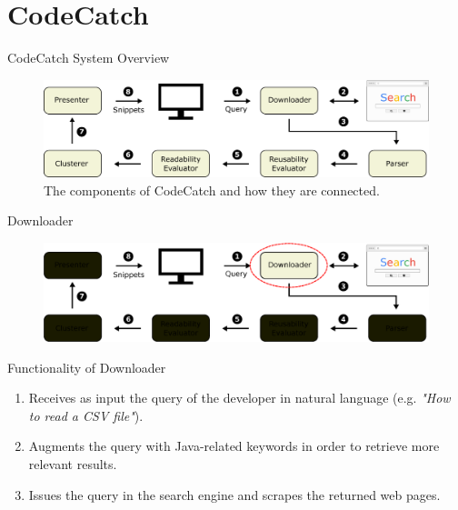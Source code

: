 \documentclass[compress]{beamer}
\begin{document}
\section{CodeCatch}
\begin{frame}{CodeCatch System Overview}

\begin{figure}
	\centering
	\includegraphics[width=\textwidth]{systemoverviewnew}
	\caption{The components of CodeCatch and how they are connected.}
\end{figure}

\end{frame}


\begin{frame}{Downloader}


\begin{figure}[t]
\includegraphics[scale=0.33]{downloader}
\end{figure}

\begin{block}{Functionality of Downloader}
\begin{enumerate}
	\item Receives as input the query of the developer in natural language (e.g. \textit{"How to read a CSV file"}).
	\item Augments the query with Java-related keywords in order to retrieve more relevant results.
	\item Issues the query in the search engine and scrapes the returned web pages.
\end{enumerate}
\end{block}


\end{frame}
\end{document}
